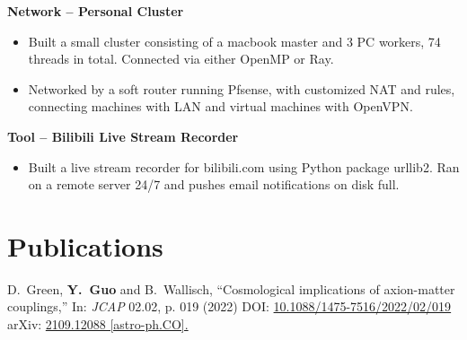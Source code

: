 \documentclass[letterpaper,12pt]{article}
\newenvironment{zitemize}{
\begin{itemize} \vspace{-.9em}\itemsep 0pt \parskip 0pt}
{\end{itemize}\vspace{-.5em}}
\begin{document}
\textbf{Network -- Personal Cluster}
\begin{zitemize}
    \item Built a small cluster consisting of a macbook master and 3 PC workers, 74 threads in total. Connected via either OpenMP or Ray.
    \item Networked by a soft router running Pfsense, with customized NAT and rules, connecting machines with LAN and virtual machines with OpenVPN.
\end{zitemize}

\textbf{Tool -- Bilibili Live Stream Recorder}
\begin{zitemize}
    \item Built a live stream recorder for bilibili.com using Python package urllib2. Ran on a remote server 24/7 and pushes email notifications on disk full.
\end{zitemize}



\section{Publications}

D.~Green, \textbf{Y.~Guo} and B.~Wallisch,
``Cosmological implications of axion-matter couplings,''
In: \textit{JCAP} 02.02, p. 019 (2022)
DOI: \href{https://iopscience.iop.org/article/10.1088/1475-7516/2022/02/019}{10.1088/1475-7516/2022/02/019}
arXiv: \href{https://arxiv.org/abs/2109.12088?context=hep-ph}{2109.12088 [astro-ph.CO].}
\end{document}
